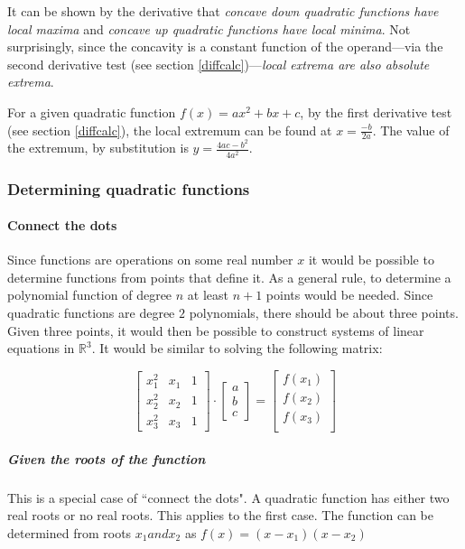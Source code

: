 It can be shown by the derivative that \emph{concave down quadratic functions have local maxima} and \emph{concave up quadratic functions have local minima}.
Not surprisingly, since the concavity is a constant function of the operand---via the second derivative test (see section \ref{diffcalc})---\emph{local extrema are also absolute extrema}.

For a given quadratic function $f(x) = ax^2+bx+c$, by the first derivative test (see section \ref{diffcalc}), the local extremum can be found at $x = \frac{-b}{2a}$.
The value of the extremum, by substitution is $y = \frac{4ac-b^2}{4a^2}$.

\subsubsection{Determining quadratic functions}
\paragraph{Connect the dots}
Since functions are operations on some real number $x$ it would be possible to determine functions from points that define it.
As a general rule, to determine a polynomial function of degree $n$ at least $n+1$ points would be needed.
Since quadratic functions are degree $2$ polynomials, there should be about three points.
Given three points, it would then be possible to construct systems of linear equations in $\mathbb{R}^3$.
It would be similar to solving the following matrix:

\[
\begin{bmatrix}
x_1^2 & x_1 & 1 \\
x_2^2 & x_2 & 1 \\
x_3^2 & x_3 & 1
\end{bmatrix}
\cdot
\begin{bmatrix}
a \\
b \\
c
\end{bmatrix}
=
\begin{bmatrix}
f(x_1) \\
f(x_2) \\
f(x_3) \\
\end{bmatrix}
\]

\subparagraph{Given the roots of the function}
This is a special case of ``connect the dots".
A quadratic function has either two real roots or no real roots.
This applies to the first case.
The function can be determined from roots $x_1 and x_2$ as $f(x) = (x-x_1)(x-x_2)$

